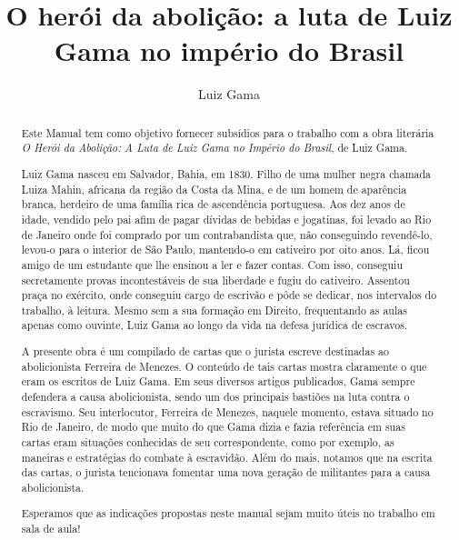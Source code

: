 \documentclass[12pt]{extarticle}
\begin{document}
\newcommand{\AutorLivro}{Luiz Gama}
\newcommand{\TituloLivro}{O herói da abolição: a luta de Luiz Gama no império do Brasil}
\newcommand{\Tema}{Diálogos com a sociologia e com a antropologia}
\newcommand{\Genero}{Diário, biografia, autobiografia, relatos, memórias}
\newcommand{\imagemCapa}{./images/PNLD0016-01.png}
\newcommand{\issnppub}{---}
\newcommand{\issnepub}{---}
\newcommand{\colaborador}{\textbf{Eduardo Modesto de Carvalho, Bruno Gradella e Vicente Castro} é uma pessoa incrível e vai fazer um bom serviço.}


\title{\TituloLivro}
\author{\AutorLivro}
\def\authornotes{\colaborador}

\date{}
\maketitle

\begin{abstract}
Este Manual tem como objetivo fornecer subsídios para o trabalho com a
obra literária \emph{O Herói da Abolição: A Luta de Luiz Gama no Império
do Brasil}, de Luiz Gama.

Luiz Gama nasceu em Salvador, Bahia, em 1830. Filho de uma mulher negra chamada 
Luiza Mahin, africana da região da Costa da Mina, e de um homem de aparência branca, 
herdeiro de uma família rica de ascendência portuguesa. Aos dez anos de idade, vendido 
pelo pai afim de pagar dívidas de bebidas e jogatinas, foi levado ao Rio de Janeiro 
onde foi comprado por um contrabandista que, não conseguindo revendê-lo, levou-o
para o interior de São Paulo, mantendo-o em cativeiro por oito anos. Lá, ficou amigo 
de um estudante que lhe ensinou a ler e fazer contas. Com isso, conseguiu secretamente 
provas incontestáveis de sua liberdade e fugiu do cativeiro. Assentou praça no exército, 
onde conseguiu cargo de escrivão e pôde se dedicar, nos intervalos do trabalho, à leitura. 
Mesmo sem a sua formação em Direito, frequentando as aulas apenas como ouvinte, Luiz Gama 
ao longo da vida na defesa jurídica de escravos. 

A presente obra é um compilado de cartas que o jurista escreve destinadas ao
abolicionista Ferreira de Menezes. O conteúdo de tais cartas mostra claramente
o que eram os escritos de Luiz Gama. Em seus diversos artigos publicados, Gama 
sempre defendera a causa abolicionista, sendo um dos principais bastiões na luta 
contra o escravismo. Seu interlocutor, Ferreira de Menezes, naquele momento, 
estava situado no Rio de Janeiro, de modo que muito do que Gama dizia e fazia 
referência em suas cartas eram situações conhecidas de seu correspondente, 
como por exemplo, as maneiras e estratégias do combate à escravidão. 
Além do mais, notamos que na escrita das cartas, o jurista tencionava fomentar uma 
nova geração de militantes para a causa abolicionista.

Esperamos que as indicações propostas neste manual sejam muito úteis no trabalho em
sala de aula! 
\end{abstract}
\end{document}

